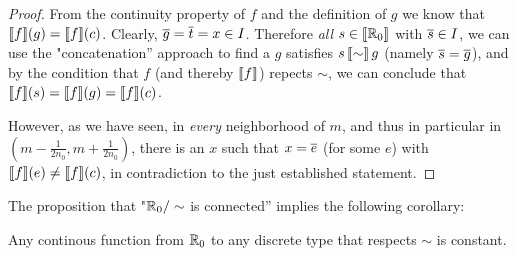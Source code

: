 \begin{proof}
From the continuity property of $f$ and the definition of
$g$ we know that $\llbracket f\rrbracket (g) = \llbracket f\rrbracket(c)$. Clearly, $\overline{g} =
\overline{t} = x \in I$. Therefore \emph{all}  $s \in \llbracket \mathbb{R}_0\rrbracket$ with $\overline{s} \in I$, we can use the "concatenation'' approach to find a $g$
satisfies $s \, \llbracket \sim\rrbracket \,  g$ (namely $\overline{s} = \overline{g}$), and by the condition that $f$ (and
thereby $\llbracket f\rrbracket$) repects $\sim$, we can conclude that $\llbracket f\rrbracket
(s) = \llbracket f\rrbracket (g) = \llbracket f\rrbracket(c)$.
 
 
However, as we have seen, in \emph{every} neighborhood of $m$, and thus in particular in $(m - \frac 1 {2n_0} , m+ \frac 1 {2n_0})$, there is an $x$ such that $x = \overline{e}$ (for some $e$) with $\llbracket f\rrbracket(e) \not= \llbracket f\rrbracket(c)$, in contradiction to the just established statement.
\end{proof}

The proposition that "$\mathbb{R}_0 / \sim$ is connected'' implies the
following corollary:

\begin{corollary}\label{dis:con}
Any continous function from $\mathbb{R}_0$ to any discrete type that respects $\sim$ is constant.
\end{corollary}




